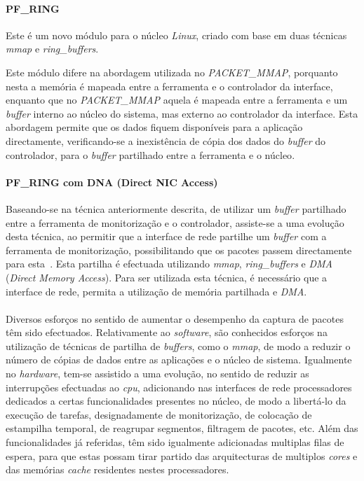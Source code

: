 

\paragraph*{PF\_RING}

Este é um novo módulo para o núcleo \textit{Linux}, criado com base em duas técnicas \textit{mmap} e \textit{ring\_buffers}.

Este módulo difere na abordagem utilizada no \textit{PACKET\_MMAP}, porquanto nesta a memória é mapeada entre a ferramenta e o controlador da interface, enquanto que no \textit{PACKET\_MMAP} aquela é mapeada entre a ferramenta e um \textit{buffer} interno ao núcleo do sistema, mas externo ao controlador da interface.
Esta abordagem permite que os dados fiquem disponíveis para a aplicação directamente, verificando-se a inexistência de cópia dos dados do \textit{buffer} do controlador, para o \textit{buffer} partilhado entre a ferramenta e o núcleo\cite{PFRING}.
 
\paragraph*{PF\_RING com DNA (Direct NIC Access)}
Baseando-se na técnica anteriormente descrita, de utilizar um \textit{buffer} partilhado entre a ferramenta de monitorização e o controlador, assiste-se a uma evolução desta técnica, ao permitir que a interface de rede partilhe um \textit{buffer} com a ferramenta de monitorização, possibilitando que os pacotes passem directamente para esta~\cite{IntroPF_RIDNADirecNICAcces}.
Esta partilha é efectuada utilizando \textit{mmap}, \textit{ring\_buffers} e \textit{DMA} (\textit{Direct Memory Access}).
Para ser utilizada esta técnica, é necessário que a interface de rede, permita a utilização de memória partilhada e \textit{DMA}.

\paragraph*{}

Diversos esforços no sentido de aumentar o desempenho da captura de pacotes têm sido efectuados.
Relativamente ao \textit{software}, são conhecidos esforços na utilização de técnicas de partilha de \textit{buffers}, como o \textit{mmap}, de modo a reduzir o número de cópias de dados entre as aplicações e o núcleo de sistema.
Igualmente no \textit{hardware}, tem-se assistido a uma evolução, no sentido de reduzir as interrupções efectuadas ao \textit{cpu}, adicionando nas interfaces de rede processadores dedicados a certas funcionalidades presentes no núcleo, de modo a libertá-lo da execução de tarefas, designadamente de monitorização, de colocação de estampilha temporal, de reagrupar segmentos, filtragem de pacotes, etc.
Além das funcionalidades já referidas, têm sido igualmente adicionadas multiplas filas de espera, para que estas possam tirar partido das arquitecturas de multiplos \textit{cores} e das memórias \textit{cache} residentes nestes processadores.


